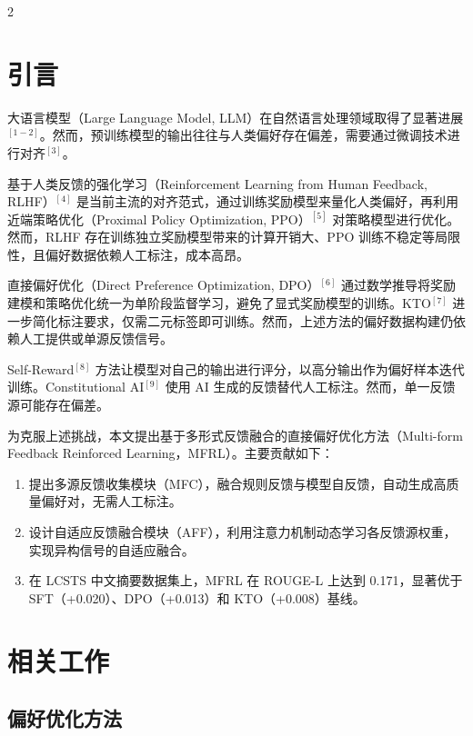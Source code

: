 \documentclass{aas}
\begin{document}
\begin{multicols}{2}

\section{引言}

大语言模型（Large Language Model, LLM）在自然语言处理领域取得了显著进展$^{[1-2]}$。然而，预训练模型的输出往往与人类偏好存在偏差，需要通过微调技术进行对齐$^{[3]}$。

基于人类反馈的强化学习（Reinforcement Learning from Human Feedback, RLHF）$^{[4]}$ 是当前主流的对齐范式，通过训练奖励模型来量化人类偏好，再利用近端策略优化（Proximal Policy Optimization, PPO）$^{[5]}$ 对策略模型进行优化。然而，RLHF 存在训练独立奖励模型带来的计算开销大、PPO 训练不稳定等局限性，且偏好数据依赖人工标注，成本高昂。

直接偏好优化（Direct Preference Optimization, DPO）$^{[6]}$ 通过数学推导将奖励建模和策略优化统一为单阶段监督学习，避免了显式奖励模型的训练。KTO$^{[7]}$ 进一步简化标注要求，仅需二元标签即可训练。然而，上述方法的偏好数据构建仍依赖人工提供或单源反馈信号。

Self-Reward$^{[8]}$ 方法让模型对自己的输出进行评分，以高分输出作为偏好样本迭代训练。Constitutional AI$^{[9]}$ 使用 AI 生成的反馈替代人工标注。然而，单一反馈源可能存在偏差。

为克服上述挑战，本文提出基于多形式反馈融合的直接偏好优化方法（Multi-form Feedback Reinforced Learning，MFRL）。主要贡献如下：

\begin{enumerate}
\item 提出多源反馈收集模块（MFC），融合规则反馈与模型自反馈，自动生成高质量偏好对，无需人工标注。
\item 设计自适应反馈融合模块（AFF），利用注意力机制动态学习各反馈源权重，实现异构信号的自适应融合。
\item 在 LCSTS 中文摘要数据集上，MFRL 在 ROUGE-L 上达到 0.171，显著优于 SFT（+0.020）、DPO（+0.013）和 KTO（+0.008）基线。
\end{enumerate}

\section{相关工作}

\subsection{偏好优化方法}


\end{multicols}
\end{document}
